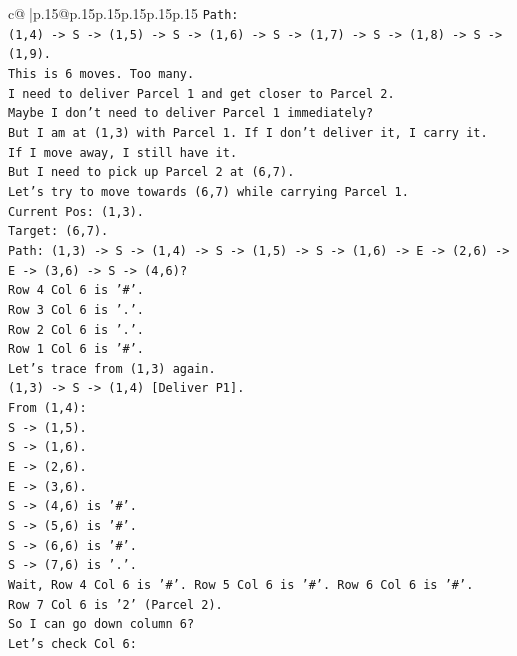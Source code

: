 \documentclass{article}
\begin{document}
{\begin{supertabular}{c@{$\;$}|p{.15\linewidth}@{}p{.15\linewidth}p{.15\linewidth}p{.15\linewidth}p{.15\linewidth}p{.15\linewidth}}
{{{\texttt{Path:} \\
\texttt{(1,4) {-}> S {-}> (1,5) {-}> S {-}> (1,6) {-}> S {-}> (1,7) {-}> S {-}> (1,8) {-}> S {-}> (1,9).} \\
\texttt{This is 6 moves. Too many.} \\
\texttt{I need to deliver Parcel 1 and get closer to Parcel 2.} \\
\texttt{Maybe I don't need to deliver Parcel 1 immediately?} \\
\texttt{But I am at (1,3) with Parcel 1. If I don't deliver it, I carry it.} \\
\texttt{If I move away, I still have it.} \\
\texttt{But I need to pick up Parcel 2 at (6,7).} \\
\texttt{Let's try to move towards (6,7) while carrying Parcel 1.} \\
\texttt{Current Pos: (1,3).} \\
\texttt{Target: (6,7).} \\
\texttt{Path: (1,3) {-}> S {-}> (1,4) {-}> S {-}> (1,5) {-}> S {-}> (1,6) {-}> E {-}> (2,6) {-}> E {-}> (3,6) {-}> S {-}> (4,6)?} \\
\texttt{Row 4 Col 6 is '\#'.} \\
\texttt{Row 3 Col 6 is '.'.} \\
\texttt{Row 2 Col 6 is '.'.} \\
\texttt{Row 1 Col 6 is '\#'.} \\
\texttt{Let's trace from (1,3) again.} \\
\texttt{(1,3) {-}> S {-}> (1,4) {[}Deliver P1{]}.} \\
\texttt{From (1,4):} \\
\texttt{S {-}> (1,5).} \\
\texttt{S {-}> (1,6).} \\
\texttt{E {-}> (2,6).} \\
\texttt{E {-}> (3,6).} \\
\texttt{S {-}> (4,6) is '\#'.} \\
\texttt{S {-}> (5,6) is '\#'.} \\
\texttt{S {-}> (6,6) is '\#'.} \\
\texttt{S {-}> (7,6) is '.'.} \\
\texttt{Wait, Row 4 Col 6 is '\#'. Row 5 Col 6 is '\#'. Row 6 Col 6 is '\#'.} \\
\texttt{Row 7 Col 6 is '2' (Parcel 2).} \\
\texttt{So I can go down column 6?} \\
\texttt{Let's check Col 6:} \\
}}}
\end{supertabular}}
\end{document}
